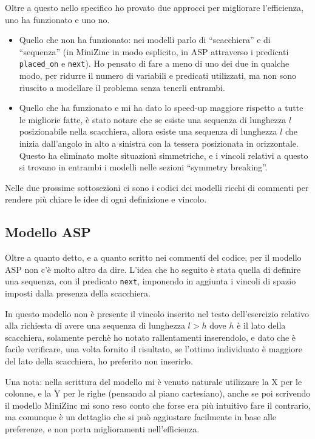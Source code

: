\documentclass[12pt,a4paper,english,italian]{article}
\begin{document}
Oltre a questo nello specifico ho provato due approcci per migliorare l'efficienza, uno ha funzionato e uno no.
\begin{itemize}
	\item Quello che non ha funzionato: nei modelli parlo di ``scacchiera'' e di ``sequenza'' (in MiniZinc in modo esplicito, in ASP attraverso i predicati \texttt{placed\_on} e \texttt{next}). Ho pensato di fare a meno di uno dei due in qualche modo, per ridurre il numero di variabili e predicati utilizzati, ma non sono riuscito a modellare il problema senza tenerli entrambi.
	\item Quello che ha funzionato e mi ha dato lo speed-up maggiore rispetto a tutte le migliorie fatte, è stato notare che se esiste una sequenza di lunghezza $l$ posizionabile nella scacchiera, allora esiste una sequenza di lunghezza $l$ che inizia dall'angolo in alto a sinistra con la tessera posizionata in orizzontale. Questo ha eliminato molte situazioni simmetriche, e i vincoli relativi a questo si trovano in entrambi i modelli nelle sezioni ``symmetry breaking''.
\end{itemize}

Nelle due prossime sottosezioni ci sono i codici dei modelli ricchi di commenti per rendere più chiare le idee di ogni definizione e vincolo.

\subsection{Modello ASP}
Oltre a quanto detto, e a quanto scritto nei commenti del codice, per il modello ASP non c'è molto altro da dire. L'idea che ho seguito è stata quella di definire una sequenza, con il predicato \texttt{next}, imponendo in aggiunta i vincoli di spazio imposti dalla presenza della scacchiera.

In questo modello non è presente il vincolo inserito nel testo dell'esercizio relativo alla richiesta di avere una sequenza di lunghezza $l > h$ dove $h$ è il lato della scacchiera, solamente perchè ho notato rallentamenti inserendolo, e dato che è facile verificare, una volta fornito il risultato, se l'ottimo individuato è maggiore del lato della scacchiera, ho preferito non inserirlo.

Una nota: nella scrittura del modello mi è venuto naturale utilizzare la X per le colonne, e la Y per le righe (pensando al piano cartesiano), anche se poi scrivendo il modello MiniZinc mi sono reso conto che forse era più intuitivo fare il contrario, ma comunque è un dettaglio che si può aggiustare facilmente in base alle preferenze, e non porta miglioramenti nell'efficienza.
\end{document}
